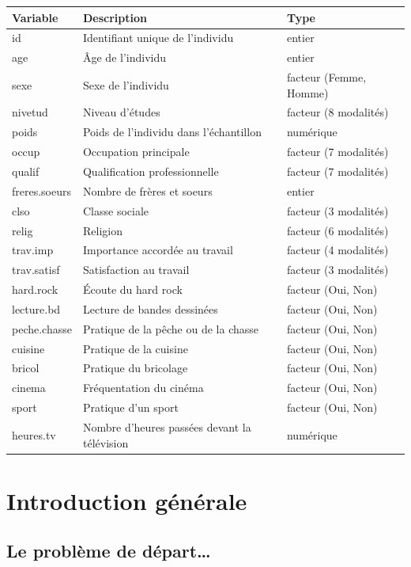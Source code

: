 \documentclass[
  french,
  10pt,
  a4paper,
]{article}
\begin{document}
\begin{longtable*}[t]{lll}
\toprule
Variable & Description & Type\\
\midrule
id & Identifiant unique de l'individu & entier\\
age & Âge de l'individu & entier\\
sexe & Sexe de l'individu & facteur (Femme, Homme)\\
nivetud & Niveau d'études & facteur (8 modalités)\\
poids & Poids de l'individu dans l'échantillon & numérique\\
\addlinespace
occup & Occupation principale & facteur (7 modalités)\\
qualif & Qualification professionnelle & facteur (7 modalités)\\
freres.soeurs & Nombre de frères et soeurs & entier\\
clso & Classe sociale & facteur (3 modalités)\\
relig & Religion & facteur (6 modalités)\\
\addlinespace
trav.imp & Importance accordée au travail & facteur (4 modalités)\\
trav.satisf & Satisfaction au travail & facteur (3 modalités)\\
hard.rock & Écoute du hard rock & facteur (Oui, Non)\\
lecture.bd & Lecture de bandes dessinées & facteur (Oui, Non)\\
peche.chasse & Pratique de la pêche ou de la chasse & facteur (Oui, Non)\\
\addlinespace
cuisine & Pratique de la cuisine & facteur (Oui, Non)\\
bricol & Pratique du bricolage & facteur (Oui, Non)\\
cinema & Fréquentation du cinéma & facteur (Oui, Non)\\
sport & Pratique d'un sport & facteur (Oui, Non)\\
heures.tv & Nombre d'heures passées devant la télévision & numérique\\
\bottomrule
\end{longtable*}

\section{Introduction générale}\label{introduction-guxe9nuxe9rale}

\subsection{Le problème de
départ\ldots{}}\label{le-probluxe8me-de-duxe9part}
\end{document}
